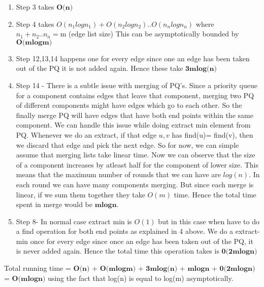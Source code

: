 \documentclass[12pt]{article}
\begin{document}
\begin{enumerate}
\item Step 3 takes $\textbf{O(n)}$
\item Step 4 takes $O(n_1logn_1) + O(n_2logn_2) ..O(n_nlogn_n)$ where $n_1 + n_2 .. n_n = $m (edge list size)
This can be asymptotically bounded by $\textbf{O(mlogm)}$
\item Step 12,13,14 happens one for every edge since one an edge has been taken out of the PQ it is not added again. Hence these take $\textbf{3mlog(n)}$
\item Step 14 - There is a subtle issue with merging of PQ's. Since a priority queue for a component contains edges that leave that component, merging two PQ of different components might have edges which go to each other. So the finally merge PQ will have edges that have both end points within the same component. We can handle this issue while doing extract min element from PQ. Whenever we do an extract, if that edge $u,v$ has find(u)= find(v), then we discard that edge and pick the next edge. So for now, we can simple assume that merging lists take linear time. Now we can observe that the size of a component increases by atleast half for the component of lower size. This means that the maximum number of rounds that we can have are $log(n)$. In each round we can have many components merging. But since each merge is linear, if we sum them together they take $O(m)$ time. Hence the total time spent in merge would be $\textbf{mlogn}$.
\item Step 8- In normal case extract min is $O(1)$ but in this case when have to do a find operation for both end points as explained in 4 above. We do a extract-min once for every edge since once an edge has been taken out of the PQ, it is never added again. Hence the total time this operation takes is $\textbf{0(2mlogn)}$
\end{enumerate}

Total running time  = $\textbf{O(n)}$ + $\textbf{O(mlogm)}$ + $\textbf{3mlog(n)}$ + $\textbf{mlogn}$ + $\textbf{0(2mlogn)}$ = $\textbf{O(mlogn)}$ using the fact that log(n) is equal to log(m) asymptotically.
\end{document}

